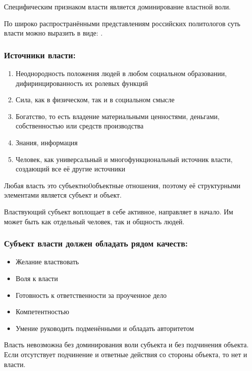 Специфическим признаком власти является доминирование властной воли.

По широко распространёнными представлениям российских политологов суть власти можно
выразить в виде: .

\subsubsection{Источники власти:}

\begin{enumerate}
      \item Неоднородность положения людей в любом социальном образовании,
            дифиринцированность их ролевых функций
      \item Сила, как в физическом, так и в социальном смысле
      \item Богатство, то есть владение материальными ценностями, деньгами,
            собственностью или средств производства
      \item Знания, информация
      \item Человек, как универсальный и многофункциональный источник власти, создающий
            все её другие источники
\end{enumerate}

Любая власть это субъектно0объектные отношения, поэтому её структурными элементами
является субъект и объект.

Властвующий субъект воплощает в себе активное, направляет в начало. Им может быть как
отдельный человек, так и общность людей.

\subsubsection{Субъект власти должен обладать рядом качеств:}

\begin{itemize}
      \item Желание властвовать
      \item Воля к власти
      \item Готовность к ответственности за проученное дело
      \item Компетентностью
      \item Умение руководить подменёнными и обладать авторитетом
\end{itemize}

Власть невозможна без доминирования воли субъекта и без подчинения объекта. Если
отсутствует подчинение и ответные действия со стороны объекта, то нет и власти.

